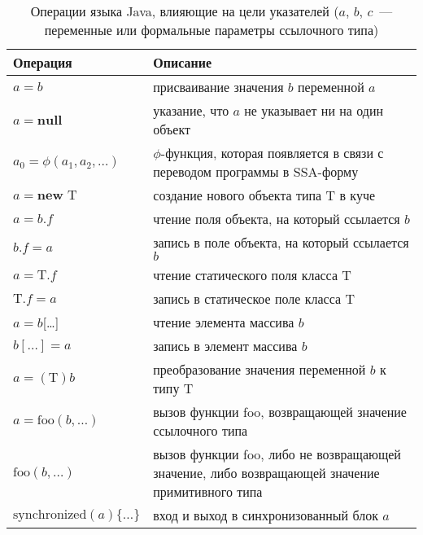 \documentclass[14pt,titlepage]{extarticle}
\newcommand{\NEW}{\textbf{new }}
\newcommand{\NULL}{\textbf{null }}
\let\oldphi\phi
\renewcommand{\phi}{\ensuremath{\oldphi}}
\begin{document}
      \begin{table}
        \begin{tabular}{|l|p{120mm}|}\hline
          \textbf{Операция} & \textbf{Описание}\\ \hline

          $a = b$
          & присваивание значения $b$ переменной $a$ \\ \hline

          $a = \NULL$
          & указание, что $a$ не указывает ни на один объект \\ \hline

          $a_0 = \phi(a_1, a_2, \ldots)$
          & \phi-функция, которая появляется в связи с переводом программы в
            SSA-форму \\ \hline

          $a = \NEW \textrm{T}$
          & создание нового объекта типа $\textrm{T}$ в куче \\ \hline

          $a = b.f$
          & чтение поля объекта, на который ссылается $b$ \\ \hline

          $b.f = a$
          & запись в поле объекта, на который ссылается $b$ \\ \hline

          $a = \textrm{T}.f$
          & чтение статического поля класса $\textrm{T}$ \\ \hline

          $\textrm{T}.f = a$
          & запись в статическое поле класса $\textrm{T}$ \\ \hline

          $a = b$[\ldots]
          & чтение элемента массива $b$ \\ \hline

          $b[\ldots] = a$
          & запись в элемент массива $b$ \\ \hline

          $a = (\textrm{T})b$
          & преобразование значения переменной $b$ к типу $\textrm{T}$ \\ \hline

          $a = \textrm{foo}(b, \ldots)$
          & вызов функции foo, возвращающей значение ссылочного типа \\ \hline

          $\textrm{foo}(b, \ldots)$
          & вызов функции foo, либо не возвращающей значение, либо возвращающей
            значение примитивного типа \\ \hline

          $\textrm{synchronized}(a) \{\ldots\}$
          & вход и выход в синхронизованный блок $a$ \\ \hline
        \end{tabular}
        \caption{Операции языка Java, влияющие на цели указателей
                 ($a$, $b$, $c$~--- переменные или формальные параметры
                 ссылочного типа)}
        \label{tabular:operations}
      \end{table}
\end{document}
